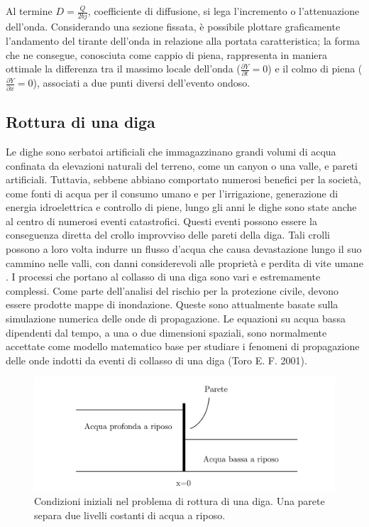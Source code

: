 \documentclass[12pt]{article} %
\begin{document}
\noindent Al termine $D=\frac{Q}{2bj}$, coefficiente di diffusione, si lega l’incremento o l’attenuazione dell’onda.
Considerando una sezione fissata, è possibile plottare graficamente l’andamento del tirante dell’onda in relazione alla portata caratteristica; la forma che ne consegue, conosciuta come cappio di piena, rappresenta in maniera ottimale la differenza tra il massimo locale dell’onda ($\frac{\partial Y}{\partial t} = 0$) e il colmo di piena ($\frac{\partial Y}{\partial x} = 0$), associati a due punti diversi dell’evento ondoso.

\subsection{Rottura di una diga}
\noindent Le dighe sono serbatoi artificiali che immagazzinano grandi volumi di acqua confinata da elevazioni naturali del terreno, come un canyon o una valle, e pareti artificiali. Tuttavia, sebbene abbiano comportato numerosi benefici per la società, come fonti di acqua per il consumo umano e per l'irrigazione, generazione di energia idroelettrica e controllo di piene, lungo gli anni le dighe sono state anche al centro di numerosi eventi catastrofici. Questi eventi possono essere la conseguenza diretta del crollo improvviso delle pareti della diga. Tali crolli possono a loro volta indurre un flusso d'acqua che causa devastazione lungo il suo cammino nelle valli, con danni considerevoli alle proprietà e perdita di vite umane . I processi che portano al collasso di una diga sono vari e estremamente complessi. Come parte dell'analisi del rischio per la protezione civile, devono essere prodotte mappe di inondazione. Queste sono attualmente basate sulla simulazione numerica delle onde di propagazione. Le equazioni su acqua bassa dipendenti dal tempo, a una o due dimensioni spaziali, sono normalmente accettate come modello matematico base per studiare i fenomeni di propagazione delle onde indotti da eventi di collasso di una diga (Toro E. F. 2001).


\begin{figure} [H]
    \centering
    \includegraphics[width=0.6\columnwidth]{Dam Break.png}
    \caption{Condizioni iniziali nel problema di rottura di una diga. Una parete separa due livelli costanti di acqua a riposo.}
    \label{fig:Dam Break}
\end{figure}
\end{document}
